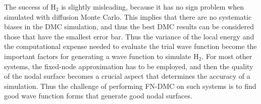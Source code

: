 \documentclass[aip,jcp,numerical,reprint]{revtex4-1}
\begin{document}
The success of H$_{2}$ is slightly misleading, because it has no sign problem when simulated with diffusion Monte Carlo.  This implies that there are no systematic biases in the DMC simulation, and thus the best DMC results can be considered those that have the smallest error bar.  Thus the variance of the local energy and the computational expense needed to evaluate the trial wave function become the important factors for generating a wave function to simulate H$_{2}$.  For most other systems, the fixed-node approximation has to be employed, and then the quality of the nodal surface becomes a crucial aspect that determines the accuracy of a simulation.  Thus the challenge of performing FN-DMC on such systems is to find good wave function forms that generate good nodal surfaces.

\end{document}
